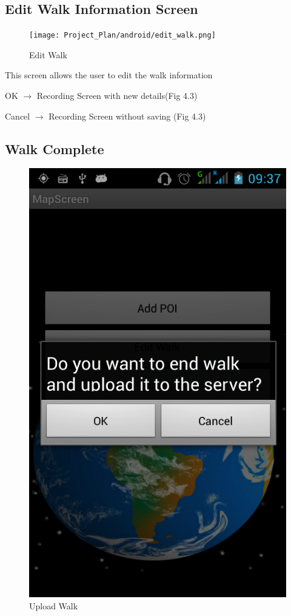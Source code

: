 \documentclass[12pt]{article}
\begin{document}
\subsection{Edit Walk Information Screen}
\begin{figure}[htp]
\centering
\texttt{[image: Project\_Plan/android/edit\_walk.png]}
\caption{Edit Walk}
\label{Edit Walk}
\end{figure}
\par{This screen allows the user to edit the walk information}
\par{OK $\rightarrow$ Recording Screen with new details(Fig 4.3)}
\par{Cancel $\rightarrow$ Recording Screen without saving (Fig 4.3)}
\clearpage
\subsection{Walk Complete}
\begin{figure}[htp]
\centering
\includegraphics[scale=0.40]{Project_Plan/android/upload_walk.png}
\caption{Upload Walk}
\label{Upload Walk}
\end{figure}
\end{document}
